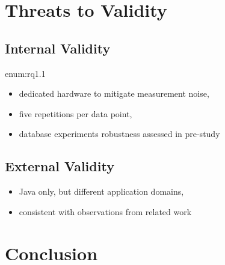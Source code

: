 \section{Threats to Validity}
\subsection{Internal Validity}enum:rq1.1
\begin{itemize}
	\item dedicated hardware to mitigate measurement noise, 
	\item five repetitions per data point, 
	\item database experiments robustness assessed in pre-study
\end{itemize}
\subsection{External Validity}
\begin{itemize}
	\item Java only, but different application domains,
	\item consistent with observations from related work
\end{itemize}
\section{Conclusion}
